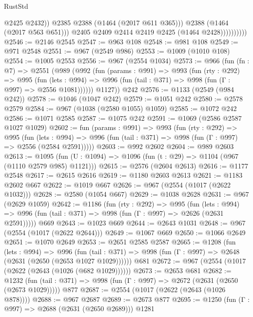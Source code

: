 \begin{lexlean}{RustStd}
\begin{coremodule}
                              @2425
                              @2432))
                          @2385
                          @2388
                          (@1464 (@2017 @611 @365)))
                        @2388
                        (@1464 (@2017 @563 @651)))
                      @2405
                      @2409
                      @2414
                      @2419
                      @2425
                      (@1464 @2428))))))))))
@2546 := @2146 @2545
@2547 := @963 @108
@2548 := @981 @108
@2549 := @971 @2548
@2551 := @967 (@2549 @986)
@2553 := @1009 (@1010 @108)
@2554 := @1005 @2553
@2556 := @967 (@2554 @1034)
@2573 := @966
    (fun (fn : @7) =>
    @2551
      (@989
        (@992
          (fun (params : @991) =>
          @993
            (fun (rty : @292) =>
            @995
              (fun (lets : @994) =>
              @996 (fun (tail : @371) => @998 (fun (Γ : @997) => @2556 @1081))))))
        @1127))
    @242
@2576 := @1133 (@2549 (@984 @242))
@2578 := @1046 (@1047 @242)
@2579 := @1051 @242
@2580 := @2578 @2579
@2584 := @967 (@1038 (@2580 @1055) @1059)
@2585 := @1072 @242
@2586 := @1071 @2585
@2587 := @1075 @242
@2591 := @1069 (@2586 @2587 @1027 @1029)
@2602 := fun (params : @991) =>
  @993
    (fun (rty : @292) =>
    @995
      (fun (lets : @994) =>
      @996 (fun (tail : @371) => @998 (fun (Γ : @997) => @2556 (@2584 @2591)))))
@2603 := @992 @2602
@2604 := @989 @2603
@2613 := @1095 (fun (U : @1094) => @1096 (fun (t : @29) => @1104 (@967 (@1110 @2579 @985) @1121)))
@2615 := @2576 (@2604 @2613)
@2616 := @1177 @2548
@2617 := @2615 @2616
@2619 := @1180 @2603 @2613
@2621 := @1183 @2602 @667
@2622 := @1019 @667
@2626 := @967 (@2554 (@1017 (@2622 @1032)))
@2628 := @2580 (@1054 @667)
@2629 := @1038 @2628
@2631 := @967 (@2629 @1059)
@2642 := @1186
    (fun (rty : @292) =>
    @995
      (fun (lets : @994) =>
      @996 (fun (tail : @371) => @998 (fun (Γ : @997) => @2626 (@2631 @2591)))))
    @669
@2643 := @1023 @669
@2644 := @2643 @1031
@2648 := @967 (@2554 (@1017 (@2622 @2644)))
@2649 := @1067 @669
@2650 := @1066 @2649
@2651 := @1070 @2649
@2653 := @2651 @2585 @2587
@2665 := @1208
    (fun (lets : @994) =>
    @996 (fun (tail : @371) => @998 (fun (Γ : @997) => @2648 (@2631 (@2650 (@2653 @1027 @1029))))))
    @681
@2672 := @967 (@2554 (@1017 (@2622 (@2643 (@1026 (@682 @1029))))))
@2673 := @2653 @681
@2682 := @1232
    (fun (tail : @371) => @998 (fun (Γ : @997) => @2672 (@2631 (@2650 (@2673 @1029)))))
    @877
@2687 := @2554 (@1017 (@2622 (@2643 (@1026 @878))))
@2688 := @967 @2687
@2689 := @2673 @877
@2695 := @1250 (fun (Γ : @997) => @2688 (@2631 (@2650 @2689))) @1281

\end{coremodule}
\end{lexlean}
